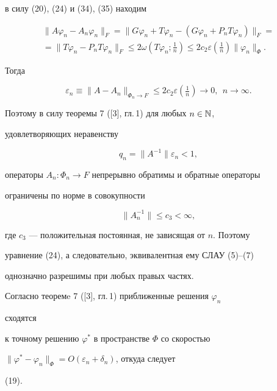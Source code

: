 \begin{pf}
в силу (20), (24) и (34), (35) находим 


\begin{multline*} 


\|A\varphi_n-A_n\varphi_n\|_F=\|G\varphi_n+T\varphi_n- 


(G\varphi_n+P_n T\varphi_n)\|_F= \\ 


% 


=\|T\varphi_n-P_n T\varphi_n\|_F\le2\omega 


(T\varphi_n;\tfrac{1}{n})\le2c_2\varepsilon(\tfrac{1}{n}) 


\|\varphi_n\|_\Phi. 


\end{multline*} 


Тогда 


$$ 


\varepsilon_n\equiv\|A-A_n\|_{\Phi_n\to F}\le2c_2\varepsilon 


(\tfrac{1}{n})\to0,\ \ n\to\infty. 


$$ 


Поэтому в силу теоремы 7 ([3], гл.\,1) для любых $n\in\Bbb N$, 


удовлетворяющих неравенству 


$$ 


q_n=\|A^{-1}\|\varepsilon_n<1, 


$$ 


операторы $A_n:\Phi_n\to F$ непрерывно обратимы и обратные операторы 


ограничены по норме в совокупности 


$$ 


\|A^{-1}_n\|\le c_3<\infty, 


$$ 


где $c_3$ --- положительная постоянная, не зависящая от $n$. Поэтому 


уравнение (24), а следовательно, эквивалентная ему СЛАУ (5)--(7) 


однозначно разрешимы при любых правых частях. 


 


Согласно теоремe 7 ([3], гл.\,1) приближенные решения $\varphi_n$ 


сходятся 


к точному решению $\varphi^*$ в пространстве $\Phi$ со скоростью 


$\|\varphi^*-\varphi_n\|_\Phi=O(\varepsilon_n+\delta_n)$, откуда следует 


(19). 


\end{pf} 



